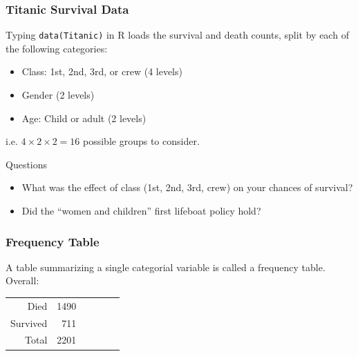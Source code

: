 \documentclass[handout]{beamer}
\newcommand{\blue}[1]{\textcolor{blue2}{#1}}
\begin{document}
\begin{frame}[fragile]
\frametitle{Titanic Survival Data}

Typing {\tt data(Titanic)} in R loads the survival and death counts, split by each of the following categories:

\pause \begin{itemize}
\item Class: 1st, 2nd, 3rd, or crew (4 levels)
\item Gender (2 levels)
\item Age: Child or adult (2 levels)
\end{itemize}

\pause i.e. $4 \times 2 \times 2 = 16$ possible groups to consider.

\vspace{0.25cm}

\pause Questions 

\begin{itemize}
\item What was the effect of class (1st, 2nd, 3rd, crew) on your chances of survival?
\pause \item Did the ``women and children'' first lifeboat policy hold?
\end{itemize} 

\end{frame}


\begin{frame}[fragile]
\frametitle{Frequency Table}
A table summarizing a single categorial variable is called a \blue{frequency table}.  Overall:

\begin{center}
\begin{tabular}{r|rrrr|r}
Died & 1490 \\
  Survived & 711 \\  
   \hline
  Total & 2201 \\
\end{tabular}
\end{center}

\end{frame}
\end{document}
